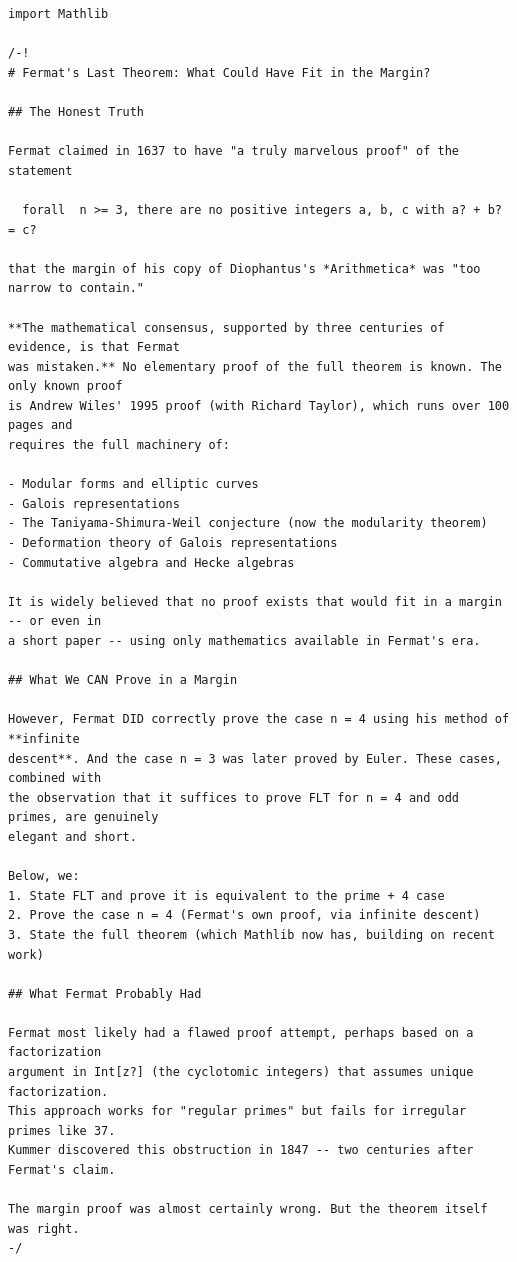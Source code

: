 \documentclass[11pt,openright,twoside]{book}
\theoremstyle{definition}
\begin{document}
\begin{lstlisting}[style=lean]
import Mathlib

/-!
# Fermat's Last Theorem: What Could Have Fit in the Margin?

## The Honest Truth

Fermat claimed in 1637 to have "a truly marvelous proof" of the statement

  forall  n >= 3, there are no positive integers a, b, c with a? + b? = c?

that the margin of his copy of Diophantus's *Arithmetica* was "too narrow to contain."

**The mathematical consensus, supported by three centuries of evidence, is that Fermat
was mistaken.** No elementary proof of the full theorem is known. The only known proof
is Andrew Wiles' 1995 proof (with Richard Taylor), which runs over 100 pages and
requires the full machinery of:

- Modular forms and elliptic curves
- Galois representations
- The Taniyama-Shimura-Weil conjecture (now the modularity theorem)
- Deformation theory of Galois representations
- Commutative algebra and Hecke algebras

It is widely believed that no proof exists that would fit in a margin -- or even in
a short paper -- using only mathematics available in Fermat's era.

## What We CAN Prove in a Margin

However, Fermat DID correctly prove the case n = 4 using his method of **infinite
descent**. And the case n = 3 was later proved by Euler. These cases, combined with
the observation that it suffices to prove FLT for n = 4 and odd primes, are genuinely
elegant and short.

Below, we:
1. State FLT and prove it is equivalent to the prime + 4 case
2. Prove the case n = 4 (Fermat's own proof, via infinite descent)
3. State the full theorem (which Mathlib now has, building on recent work)

## What Fermat Probably Had

Fermat most likely had a flawed proof attempt, perhaps based on a factorization
argument in Int[z?] (the cyclotomic integers) that assumes unique factorization.
This approach works for "regular primes" but fails for irregular primes like 37.
Kummer discovered this obstruction in 1847 -- two centuries after Fermat's claim.

The margin proof was almost certainly wrong. But the theorem itself was right.
-/


\end{lstlisting}
\end{document}
